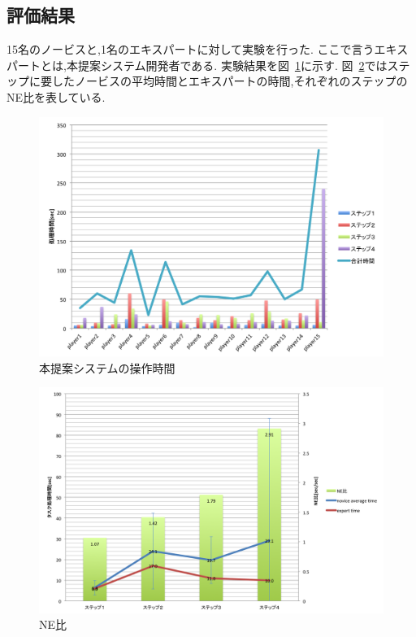 \documentclass[sotsuron]{kuee}
\begin{document}
		\subsection{評価結果}
			15名のノービスと,1名のエキスパートに対して実験を行った. 
			ここで言うエキスパートとは,本提案システム開発者である. 
			実験結果を図~\ref{fig:result01}に示す. 
			図~\ref{fig:result02}ではステップに要したノービスの平均時間とエキスパートの時間,それぞれのステップのNE比を表している. 
			\begin{figure}
				\begin{center}
					\includegraphics[width=\linewidth]{./png/result01.png}
				\end{center}
				\caption{本提案システムの操作時間}
		  		\label{fig:result01}
			\end{figure}
			\begin{figure}
				\begin{center}
					\includegraphics[width=\linewidth]{./png/result02.png}
				\end{center}
				\caption{NE比}
		  		\label{fig:result02}
			\end{figure}
\end{document}
